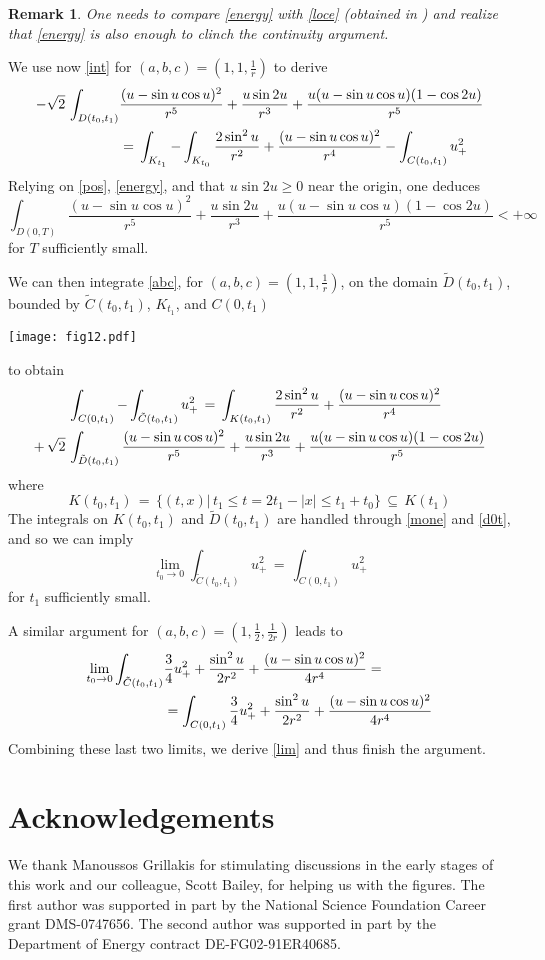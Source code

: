 \documentclass{amsart}
\newtheorem{remark}[theorem]{Remark}
\begin{document}
\begin{remark}
One needs to compare \eqref{energy} with  \eqref{loce} (obtained in \cite{GR1}) and realize that \eqref{energy} is also enough to clinch the continuity argument.
\end{remark}

We use now \eqref{int} for $(a,b,c)=(1,1,\frac 1r)$ to derive
\[
\aligned
-\sqrt 2\,\int_{D(t_0,t_1)}  &\frac{(u-\sin u \cos u)^2}{r^5} + \frac{u\sin{2u}}{r^3} + \frac{u(u-\sin u \cos u)(1- \cos 2u)}{r^5}\\
&=\,\int_{K_{t_1}} - \int_{K_{t_0}} \frac{2\sin^2u}{r^2}+\frac{(u-\sin u \cos u)^2}{r^4} - \int_{C(t_0,t_1)} u_+^2\endaligned\]
Relying on \eqref{pos}, \eqref{energy}, and that $u\sin{2u}\geq 0$ near the origin, one deduces
\begin{equation}
\int_{D(0,T)} \frac{(u-\sin u \cos u)^2}{r^5} + \frac{u\sin{2u}}{r^3} + \frac{u(u-\sin u \cos u)(1- \cos 2u)}{r^5} < +\infty
\label{d0t}\end{equation}
for $T$ sufficiently small.

We can then integrate \eqref{abc}, for $(a,b,c)=(1,1,\frac 1r)$, on the domain $\tilde{D}(t_0,t_1)$, bounded by $\tilde{C}(t_0,t_1)$, $K_{t_1}$, and $C(0,t_1)$
\begin{center}
\texttt{[image: fig12.pdf]}
\end{center}
to obtain
\[
\aligned
&\int_{C(0,t_1)} - \int_{\tilde{C}(t_0,t_1)} u_+^2\,=\,\int_{K(t_0,t_1)} \frac{2\sin^2u}{r^2}+\frac{(u-\sin u \cos u)^2}{r^4} \\
+ \,\sqrt 2\,&\int_{\tilde{D}(t_0,t_1)}  \frac{(u-\sin u \cos u)^2}{r^5} + \frac{u\sin{2u}}{r^3} + \frac{u(u-\sin u \cos u)(1- \cos 2u)}{r^5}
\endaligned
\]
where
\[
K(t_0,t_1)\,=\,\{(t,x)|\,  t_1 \leq t=2t_1-|x| \leq t_1+t_0\}\,\subseteq \,K(t_1)
\]
The integrals on $K(t_0,t_1)$ and $\tilde{D}(t_0,t_1)$ are handled through \eqref{mone} and \eqref{d0t}, and so we can imply
\[\lim_{t_0\to 0} \int_{\tilde{C}(t_0,t_1)} u_+^2\,=\,\int_{C(0,t_1)} u_+^2\]
for $t_1$ sufficiently small.

A similar argument for $(a,b,c)=(1,\frac 12,\frac{1}{2r})$ leads to
\[
\aligned
\lim_{t_0\to 0} \int_{\tilde{C}(t_0,t_1)} &\frac{3}{4}u_+^2 +  \frac{\sin^2u}{2r^2}+\frac{(u-\sin u \cos u)^2}{4r^4}=\\
&= \int_{C(0,t_1)} \frac{3}{4}u_+^2 +  \frac{\sin^2u}{2r^2}+\frac{(u-\sin u \cos u)^2}{4r^4}
\endaligned
\]
Combining these last two limits, we derive \eqref{lim} and thus finish the argument.

\section*{Acknowledgements}
We thank Manoussos Grillakis for stimulating discussions in the early stages of this work and our colleague, Scott Bailey, for helping us with the figures. The first author was supported in part by the National Science Foundation Career grant DMS-0747656. The second author was supported in part by the Department of Energy contract DE-FG02-91ER40685.
\end{document}
